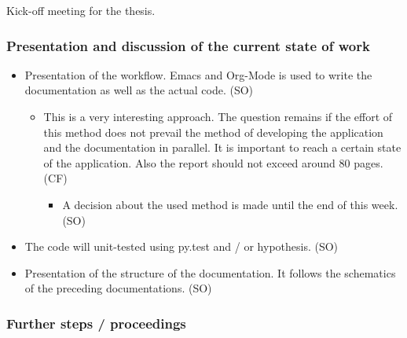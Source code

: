 \documentclass[10pt, openright, notitlepage]{scrreprt}
\begin{document}
Kick-off meeting for the thesis.

\subsubsection{Presentation and discussion of the current state of work}
\label{sec:org19d2a68}

\begin{itemize}
\item Presentation of the workflow. Emacs and Org-Mode is used to write the
documentation as well as the actual code. (SO)
\begin{itemize}
\item This is a very interesting approach. The question remains if the effort of
this method does not prevail the method of developing the application and
the documentation in parallel. It is important to reach a certain state of
the application. Also the report should not exceed around 80 pages. (CF)
\begin{itemize}
\item A decision about the used method is made until the end of this week. (SO)
\end{itemize}
\end{itemize}
\item The code will unit-tested using py.test and / or hypothesis. (SO)
\item Presentation of the structure of the documentation. It follows the schematics
of the preceding documentations. (SO)
\end{itemize}

\subsubsection{Further steps / proceedings}
\label{sec:org4e8b72a}
\end{document}
